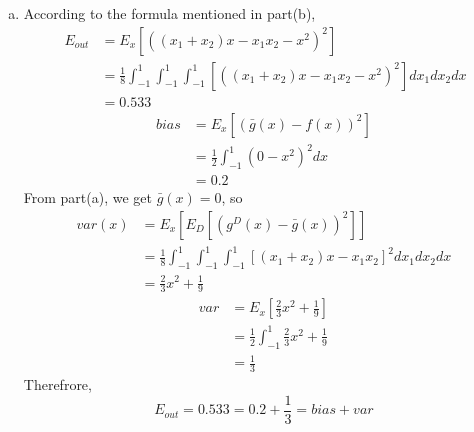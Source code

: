 \documentclass[11pt]{article}
\begin{document}
\begin{enumerate} [(a)]
	\newpage
	
	\item According to the formula mentioned in part(b),\[\
		\begin{aligned}
		E_{out}&=E_x[((x_1+x_2)x-x_1x_2-x^2)^2]\\
		&=\frac{1}{8}\int^1_{-1}\int^1_{-1}\int^1_{-1}[((x_1+x_2)x-x_1x_2-x^2)^2]dx_1dx_2dx\\
		&=0.533
		\end{aligned}
	\]
	\[
		\begin{aligned}
		bias&=E_x[(\bar{g}(x)-f(x))^2]\\
		&=\frac{1}{2}\int^1_{-1}(0-x^2)^2dx\\
		&=0.2
		\end{aligned}
	\]
	From part(a), we get $\bar{g}(x)=0$, so
	\[
		\begin{aligned}
		var(x)&=E_x[E_D[(g^D(x)-\bar{g}(x))^2]]\\
		&=\frac{1}{8}\int^1_{-1}\int^1_{-1}\int^1_{-1}[(x_1+x_2)x-x_1x_2]^2dx_1dx_2dx\\
		&=\frac{2}{3}x^2+\frac{1}{9}
		\end{aligned}
	\]
	\[
		\begin{aligned}
		var&=E_x[\frac{2}{3}x^2+\frac{1}{9}]\\
		&=\frac{1}{2}\int^1_{-1}\frac{2}{3}x^2+\frac{1}{9}\\
		&=\frac{1}{3}
		\end{aligned}
	\]
	Therefrore,\[
		E_{out} = 0.533=0.2+\frac{1}{3}=bias+var
	\]
\end{enumerate}
\newpage
\end{document}

